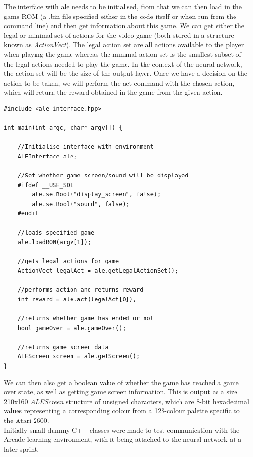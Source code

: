 \documentclass[10pt]{article}
\begin{document}
		The interface with ale needs to be initialised, from that we can then load in the game ROM (a .bin file specified either in the code itself or when run from the command line) and then get information about this game. We can get either the legal or minimal set of actions for the video game (both stored in a structure known as \textit{ActionVect}). The legal action set are all actions available to the player when playing the game whereas the minimal action set is the smallest subset of the legal actions needed to play the game. In the context of the neural network, the action set will be the size of the output layer. Once we have a decision on the action to be taken, we will perform the act command with the chosen action, which will return the reward obtained in the game from the given action. 	 
		
		\renewcommand{\lstlistingname}{Code Listing}
		\begin{lstlisting}[caption={ALEInterface in C++},label={ALEIO}]	
#include <ale_interface.hpp>

int main(int argc, char* argv[]) {

	//Initialise interface with environment
	ALEInterface ale;
	
	//Set whether game screen/sound will be displayed
	#ifdef __USE_SDL
		ale.setBool("display_screen", false);
		ale.setBool("sound", false);
	#endif

	//loads specified game 
	ale.loadROM(argv[1]); 

	//gets legal actions for game
	ActionVect legalAct = ale.getLegalActionSet();

	//performs action and returns reward
	int reward = ale.act(legalAct[0]);
	
	//returns whether game has ended or not
	bool gameOver = ale.gameOver();

	//returns game screen data
	ALEScreen screen = ale.getScreen();	
}

		\end{lstlisting}
			
		We can then also get a boolean value of whether the game has reached a game over state, as well as getting game screen information. This is output as a size 210x160 \textit{ALEScreen} structure of unsigned characters, which are 8-bit hexadecimal values representing a corresponding colour from a 128-colour palette specific to the Atari 2600.\\
		
		Initially small dummy C++ classes were made to test communication with the Arcade learning environment, with it being attached to the neural network at a later sprint.
	\medskip
	
\end{document}
